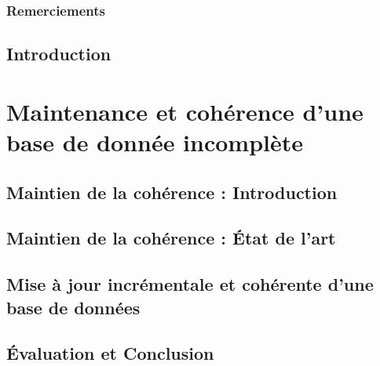 
\pagestyle{fancy}


\frontmatter
\section*{Remerciements}
\lipsum[17-19]

\newpage

\dominitoc
\tableofcontents
{}
\listoffigures
{}
\listoftables

\mainmatter

\chapter{Introduction}



\part{Maintenance et cohérence d'une base de donnée incomplète}

\chapter{Maintien de la cohérence : Introduction}
\label{chp:update:intro}
\minitoc


\chapter{Maintien de la cohérence : État de l'art}
\label{chp:update:soa}
\minitoc


\chapter{Mise à jour incrémentale et cohérente d'une base de données}
\label{chp:update:algos}
\minitoc


\chapter{Évaluation et Conclusion}
\label{chp:update:eval}
\minitoc


